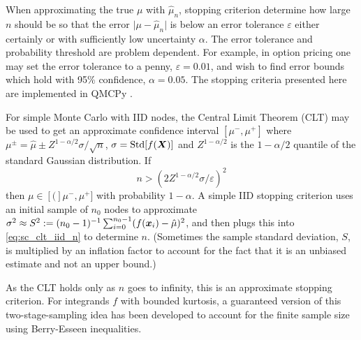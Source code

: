 \documentclass{svproc}
\begin{document}
When approximating the true $\mu$ with $\hat{\mu}_n$, stopping criterion determine how large $n$ should be so that the error $\lvert \mu - \hat{\mu}_n \rvert$ is below an error tolerance $\varepsilon$ either certainly or with sufficiently low uncertainty $\alpha$. The error tolerance and probability threshold are problem dependent. For example, in option pricing one may set the error tolerance to a penny, $\varepsilon=0.01$, and wish to find error bounds which hold with 95\% confidence, $\alpha=0.05$. The stopping criteria presented here are implemented in QMCPy \cite{QMCPy2020a}.

For simple Monte Carlo with IID nodes, the Central Limit Theorem (CLT) may be used to get an approximate confidence interval $[\mu^-,\mu^+]$ where $\mu^\pm = \hat{\mu} \pm Z^{1-\alpha/2} \sigma/\sqrt{n}$, $\sigma = \mathrm{Std}[f({\boldsymbol{X}})]$ and $Z^{1-\alpha/2}$ is the $1-\alpha/2$ quantile of the standard Gaussian distribution. If 
\begin{equation}
    n > (2 Z^{1-\alpha/2} \sigma/\varepsilon)^2
    \label{eq:sc_clt_iid_n}
\end{equation} then $\mu \in [(]\mu^-,\mu^+]$ with probability $1-\alpha$. A simple IID stopping criterion uses an initial sample of $n_0$ nodes to approximate $\sigma^2 \approx S^2 := (n_0-1)^{-1} \sum_{i=0}^{n_0-1}(f({\boldsymbol{x}}_i)-\hat{\mu})^2$, and then plugs this into \eqref{eq:sc_clt_iid_n} to determine $n$. (Sometimes the sample standard deviation, $S$, is multiplied by an inflation factor to account for the fact that it is an unbiased estimate and not an upper bound.) 

As the CLT holds only as $n$ goes to infinity, this is an approximate stopping criterion. For integrands $f$ with bounded kurtosis, a guaranteed version of this two-stage-sampling idea has been developed to account for the finite sample size using  Berry-Esseen inequalities\cite{HicEtal14a}. 
\end{document}
